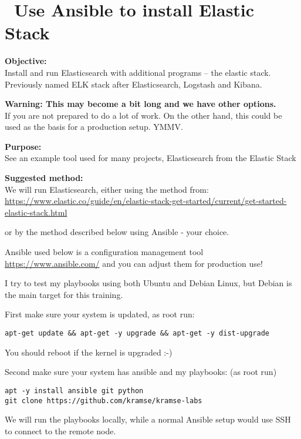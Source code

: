 \documentclass[a4paper,11pt,notitlepage]{report}
\begin{document}
\chapter{\faInfoCircle\ Use Ansible to install Elastic Stack}
\label{ex:basicansible}


{\bf Objective:}\\
Install and run Elasticsearch with additional programs -- the elastic stack. Previously named ELK stack after Elasticsearch, Logstash and Kibana.

{\bf Warning: This may become a bit long and we have other options.}\\
If you are not prepared to do a lot of work. On the other hand, this could be used as the basis for a production setup. YMMV.

{\bf Purpose:}\\
See an example tool used for many projects, Elasticsearch from the Elastic Stack

{\bf Suggested method:}\\
We will run Elasticsearch, either using the method from:\\{\footnotesize
\url{https://www.elastic.co/guide/en/elastic-stack-get-started/current/get-started-elastic-stack.html}}

or by the method described below using Ansible - your choice.

Ansible used below is a configuration management tool \url{https://www.ansible.com/} and you can adjust them for production use!

I try to test my playbooks using both Ubuntu and Debian Linux, but Debian is the main target for this training.

First make sure your system is updated, as root run:

\begin{verbatim}
apt-get update && apt-get -y upgrade && apt-get -y dist-upgrade
\end{verbatim}

You should reboot if the kernel is upgraded :-)

Second make sure your system has ansible and my playbooks: (as root run)
\begin{verbatim}
apt -y install ansible git python
git clone https://github.com/kramse/kramse-labs
\end{verbatim}

We will run the playbooks locally, while a normal Ansible setup would use SSH to connect to the remote node.
\end{document}
